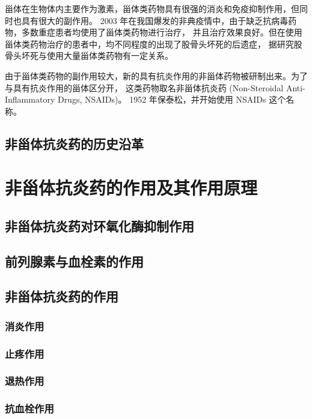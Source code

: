 \documentclass[12pt, a4paper, oneside]{ctexart}
\begin{document}
甾体在生物体内主要作为激素，甾体类药物具有很强的消炎和免疫抑制作用，但同时也具有很大的副作用。
2003 年在我国爆发的非典疫情中，由于缺乏抗病毒药物，多数重症患者均使用了甾体类药物进行治疗，
并且治疗效果良好。但在使用甾体类药物治疗的患者中，均不同程度的出现了股骨头坏死的后遗症，
据研究股骨头坏死与使用大量甾体类药物有一定关系\cite{ref2}。

由于甾体类药物的副作用较大，新的具有抗炎作用的非甾体药物被研制出来。为了与具有抗炎作用的甾体区分开，
这类药物取名非甾体抗炎药 (Non-Steroidal Anti-Inflammatory Drugs, NSAIDs)。
1952 年保泰松，并开始使用 NSAIDs 这个名称。

\subsection{非甾体抗炎药的历史沿革}


\newpage
\section{非甾体抗炎药的作用及其作用原理}
\subsection{非甾体抗炎药对环氧化酶抑制作用}

\subsection{前列腺素与血栓素的作用}

\subsection{非甾体抗炎药的作用}
\subsubsection{消炎作用}

\subsubsection{止疼作用}

\subsubsection{退热作用}

\subsubsection{抗血栓作用}
\end{document}
